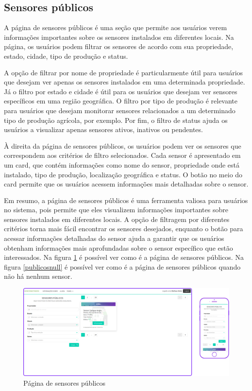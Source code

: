\documentclass[tcc,capa]{texufpel}
\begin{document}
\subsection{Sensores públicos}
A página de sensores públicos é uma seção que permite aos usuários verem informações importantes sobre os sensores instalados em diferentes locais. Na página, os usuários podem filtrar os sensores de acordo com sua propriedade, estado, cidade, tipo de produção e status.

A opção de filtrar por nome de propriedade é particularmente útil para usuários que desejam ver apenas os sensores instalados em uma determinada propriedade. Já o filtro por estado e cidade é útil para os usuários que desejam ver sensores específicos em uma região geográfica. O filtro por tipo de produção é relevante para usuários que desejam monitorar sensores relacionados a um determinado tipo de produção agrícola, por exemplo. Por fim, o filtro de status ajuda os usuários a visualizar apenas sensores ativos, inativos ou pendentes.

À direita da página de sensores públicos, os usuários podem ver os sensores que correspondem aos critérios de filtro selecionados. Cada sensor é apresentado em um card, que contém informações como nome do sensor, propriedade onde está instalado, tipo de produção, localização geográfica e status. O botão no meio do card permite que os usuários acessem informações mais detalhadas sobre o sensor.

Em resumo, a página de sensores públicos é uma ferramenta valiosa para usuários no sistema, pois permite que eles visualizem informações importantes sobre sensores instalados em diferentes locais. A opção de filtragem por diferentes critérios torna mais fácil encontrar os sensores desejados, enquanto o botão para acessar informações detalhadas do sensor ajuda a garantir que os usuários obtenham informações mais aprofundadas sobre o sensor específico que estão interessados.  Na figura \ref{publicos} é possível ver como é a página de sensores públicos. Na figura \ref{publicosnull} é possível ver como é a página de sensores públicos quando não há nenhum sensor.
\begin{figure}[htbp]
  \centering \includegraphics[scale=.2]{assets/sensorespublicos.png}
  \caption{Página de sensores públicos}
  \label{publicos}
\end{figure}
\end{document}
